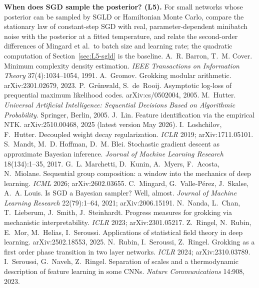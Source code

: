   \item \textbf{When does SGD sample the posterior? (L5).} For small networks whose posterior can be sampled by SGLD or Hamiltonian Monte Carlo, compare the stationary law of constant-step SGD with real, parameter-dependent minibatch noise with the posterior at a fitted temperature, and relate the second-order differences of Mingard et al.\ to batch size and learning rate; the quadratic computation of Section~\ref{sec:L5-sgld} is the baseline.
 A.~R. Barron, T.~M. Cover. Minimum complexity density estimation. \emph{IEEE Transactions on Information Theory} 37(4):1034--1054, 1991.
 A.~Gromov. Grokking modular arithmetic. arXiv:2301.02679, 2023.
 P.~Gr\"unwald, S.~de~Rooij. Asymptotic log-loss of prequential maximum likelihood codes. arXiv:cs/0502004, 2005.
 M.~Hutter. \emph{Universal Artificial Intelligence: Sequential Decisions Based on Algorithmic Probability}. Springer, Berlin, 2005.
 J.~Lin. Feature identification via the empirical NTK. arXiv:2510.00468, 2025 (latest version May 2026).
 I.~Loshchilov, F.~Hutter. Decoupled weight decay regularization. \emph{ICLR} 2019; arXiv:1711.05101.
 S.~Mandt, M.~D. Hoffman, D.~M. Blei. Stochastic gradient descent as approximate Bayesian inference. \emph{Journal of Machine Learning Research} 18(134):1--35, 2017.
 G.~L. Marchetti, D.~Kunin, A.~Myers, F.~Acosta, N.~Miolane. Sequential group composition: a window into the mechanics of deep learning. \emph{ICML} 2026; arXiv:2602.03655.
 C.~Mingard, G.~Valle-P\'erez, J.~Skalse, A.~A. Louis. Is SGD a Bayesian sampler? Well, almost. \emph{Journal of Machine Learning Research} 22(79):1--64, 2021; arXiv:2006.15191.
 N.~Nanda, L.~Chan, T.~Lieberum, J.~Smith, J.~Steinhardt. Progress measures for grokking via mechanistic interpretability. \emph{ICLR} 2023; arXiv:2301.05217.
 Z.~Ringel, N.~Rubin, E.~Mor, M.~Helias, I.~Seroussi. Applications of statistical field theory in deep learning. arXiv:2502.18553, 2025.
 N.~Rubin, I.~Seroussi, Z.~Ringel. Grokking as a first order phase transition in two layer networks. \emph{ICLR} 2024; arXiv:2310.03789.
 I.~Seroussi, G.~Naveh, Z.~Ringel. Separation of scales and a thermodynamic description of feature learning in some CNNs. \emph{Nature Communications} 14:908, 2023.
